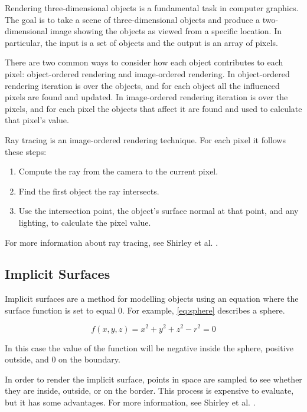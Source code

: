 \documentclass[conference]{acmsiggraph}
\begin{document}
Rendering three-dimensional objects is a fundamental task in computer 
graphics.  The goal is to take a scene of three-dimensional objects 
and produce a two-dimensional image showing the objects as viewed
from a specific location.  In particular, the input is a set of 
objects and the output is an array of pixels.

There are two common ways to consider how each object contributes to each 
pixel: object-ordered rendering and image-ordered rendering.  In
object-ordered rendering iteration is over the objects, and for
each object all the influenced pixels are found and updated.  In
image-ordered rendering iteration is over the pixels, and for each
pixel the objects that affect it are found and used to calculate
that pixel's value.

Ray tracing is an image-ordered rendering technique.  For each pixel
it follows these steps:
\begin{enumerate}
	\item Compute the ray from the camera to the current pixel.
	\item Find the first object the ray intersects.
	\item Use the intersection point, the object's surface normal at that
	point, and any lighting, to calculate the pixel value.
\end{enumerate}

For more information about ray tracing, see Shirley et al. \cite{Shirley}.

\subsection{Implicit Surfaces}

Implicit surfaces are a method for modelling objects using an equation
where the surface function is set to equal 0.  For example, \ref{eq:sphere}
describes a sphere.

\begin{equation}
\label{eq:sphere}
f(x, y, z) = x^2 + y^2 + z^2 - r^2 = 0
\end{equation}

In this case the value of the function will be negative inside the 
sphere, positive outside, and 0 on the boundary.

In order to render the implicit surface, points in space are sampled
to see whether they are inside, outside, or on the border.  This process
is expensive to evaluate, but it has some advantages.  For more information,
see Shirley et al. \cite{Shirley}.
\end{document}
